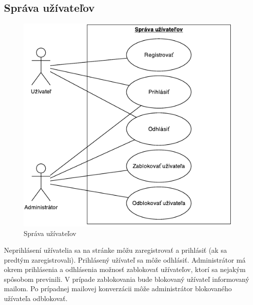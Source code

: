 \documentclass[12pt,a4paper]{scrartcl}
\begin{document}
\subsection{Správa užívateľov}
\begin{figure}[H]
	\centering
	\includegraphics{use_case/turistika_sprava_uzivatelov.pdf}
	\caption{Správa užívateľov}
\end{figure}

Neprihlásení užívatelia sa na stránke môžu zaregistrovať a prihlásiť (ak sa predtým zaregistrovali). Prihlásený užívateľ sa môže odhlásiť. Administrátor má okrem prihlásenia a odhlásenia možnosť zablokovať užívateľov, ktorí sa nejakým spôsobom previnili. V prípade zablokovania bude blokovaný užívateľ informovaný mailom. Po prípadnej mailovej konverzácii môže administrátor blokovaného užívateľa odblokovať.
\end{document}

